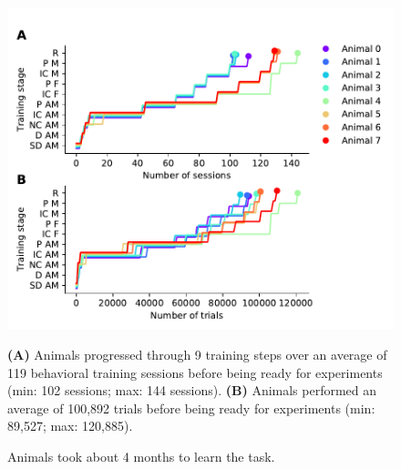 \begin{figure}[hp] \begin{center}
	\includegraphics[width=6in]{figures/chapter4/figure_training}%
\end{center} \caption{Animals took about 4 months to learn the
task.}{\textbf{(A)} Animals progressed through 9 training steps over an average
of 119 behavioral training sessions before being ready for experiments (min:
102 sessions; max: 144 sessions). 
%
\textbf{(B)} Animals performed an average of 100,892 trials before being ready
for experiments (min: 89,527; max: 120,885). 
%
} \end{figure}

